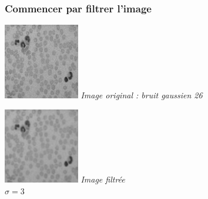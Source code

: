 \documentclass[a4,12pt]{article}
\begin{document}
\subsubsection{Commencer par filtrer l'image}
\noindent
\begin{center}
\begin{minipage}[c]{0.20\linewidth}
	\begin{center}
		\includegraphics[width = 33mm]{./img/globulesbb26.jpg}
		\textit{Image original : bruit gaussien 26}
	\end{center}
\end{minipage}
\begin{minipage}[c]{0.20\linewidth}
	\begin{center}
		\includegraphics[width = 33mm]{./img/globulesbb26_filtrer3.jpg}
		\textit{Image filtrée \\ $\sigma=3$}
	\end{center}
\end{minipage}
\end{center}
\end{document}
